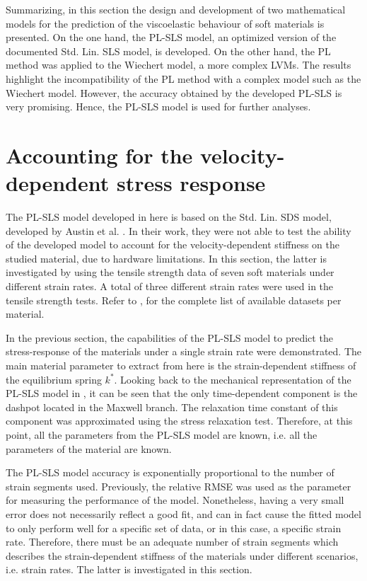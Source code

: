 Summarizing, in this section the design and development of two mathematical models for the prediction of the viscoelastic behaviour of soft materials is presented. On the one hand, the PL-SLS model, an optimized version of the documented Std. Lin. SLS model, is developed. On the other hand, the PL method was applied to the Wiechert model, a more complex LVMs. The results highlight the incompatibility of the PL method with a complex model such as the Wiechert model. However, the accuracy obtained by the developed PL-SLS is very promising. Hence, the PL-SLS model is used for further analyses.

\section{Accounting for the velocity-dependent stress response}

The PL-SLS model developed in here is based on the Std. Lin. SDS model, developed by Austin et al. \cite{austin2015control}. In their work, they were not able to test the ability of the developed model to account for the velocity-dependent stiffness on the studied material, due to hardware limitations. In this section, the latter is investigated by using the tensile strength data of seven soft materials under different strain rates. A total of three different strain rates were used in the tensile strength tests. Refer to , for the complete list of available datasets per material.

In the previous section, the capabilities of the PL-SLS model to predict the stress-response of the materials under a single strain rate were demonstrated. The main material parameter to extract from here is the strain-dependent stiffness of the equilibrium spring $k^*$. Looking back to the mechanical representation of the PL-SLS model in , it can be seen that the only time-dependent component is the dashpot located in the Maxwell branch. The relaxation time constant of this component was approximated using the stress relaxation test. Therefore, at this point, all the parameters from the PL-SLS model are known, i.e. all the parameters of the material are known.  

The PL-SLS model accuracy is exponentially proportional to the number of strain segments used. Previously, the relative RMSE was used as the parameter for measuring the performance of the model. Nonetheless, having a very small error does not necessarily reflect a good fit, and can in fact cause the fitted model to only perform well for a specific set of data, or in this case, a specific strain rate. Therefore, there must be an adequate number of strain segments which describes the strain-dependent stiffness of the materials under different scenarios, i.e. strain rates. The latter is investigated in this section.

